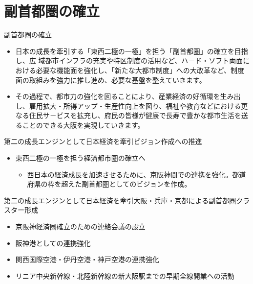 \documentclass[dvipdfmx]{beamer}
\begin{document}
\section{副首都圏の確立}
    \begin{frame}
        \sectionpage
    \end{frame}

    \begin{frame}{副首都圏の確立}{}
        \begin{small}
            \begin{itemize}
                \setlength{\itemsep}{2mm}
                \item 日本の成長を牽引する「東西二極の一極」を担う「副首都圏」の確立を目指し、広 域都市インフラの充実や特区制度の活用など、ハ－ド・ソフト両面における必要な機能面を強化し、「新たな大都市制度」への大改革など、制度面の取組みを強力に推し進め、必要な基盤を整えていきます。
                \item その過程で、都市力の強化を図ることにより、産業経済の好循環を生み出し、雇用拡大・所得アップ・生産性向上を図り、福祉や教育などにおける更なる住民サ－ビスを拡充し、府民の皆様が健康で長寿で豊かな都市生活を送ることのできる大阪を実現していきます。
            \end{itemize}
        \end{small}
    \end{frame}

    \begin{frame}{第二の成長エンジンとして日本経済を牽引}{ビジョン作成への推進}
        \begin{itemize}
            \setlength{\itemsep}{5mm}
            \item 東西二極の一極を担う経済都市圏の確立へ
            \vspace{2mm}
            \begin{itemize}
                \setlength{\itemsep}{2mm}
                \item 西日本の経済成長を加速させるために、京阪神間での連携を強化。都道府県の枠を超えた副首都圏としてのビジョンを作成。
            \end{itemize}
        \end{itemize}
    \end{frame}

    \begin{frame}{第二の成長エンジンとして日本経済を牽引}{大阪・兵庫・京都による副首都圏クラスター形成}
        \begin{small}
            \begin{itemize}
                \setlength{\itemsep}{5mm}
                \item 京阪神経済圏確立のための連絡会議の設立
                \item 阪神港としての連携強化
                \item 関西国際空港・伊丹空港・神戸空港の連携強化
                \item リニア中央新幹線・北陸新幹線の新大阪駅までの早期全線開業への活動
            \end{itemize}
        \end{small}
    \end{frame}
\end{document}
